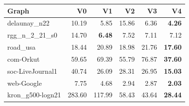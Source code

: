 \begin{tabular}{lrrrrr}
\hline
Graph & V0 & V1 & V2 & V3 & V4 \\
\hline
delaunay\_n22 & 10.19 & 5.85 & 15.86 & 6.36 & \textbf{4.26} \\
rgg\_n\_2\_21\_s0 & 14.70 & \textbf{6.48} & 7.52 & 7.11 & 7.12 \\
road\_usa & 18.44 & 20.89 & 18.98 & 21.76 & \textbf{17.60} \\
com-Orkut & 59.65 & 69.39 & 55.79 & 76.87 & \textbf{37.60} \\
soc-LiveJournal1 & 40.74 & 26.09 & 28.31 & 26.95 & \textbf{15.03} \\
web-Google & 7.75 & 4.68 & 2.94 & 2.87 & \textbf{2.03} \\
kron\_g500-logn21 & 283.60 & 117.99 & 58.43 & 43.64 & \textbf{28.44} \\
\hline
\end{tabular}
